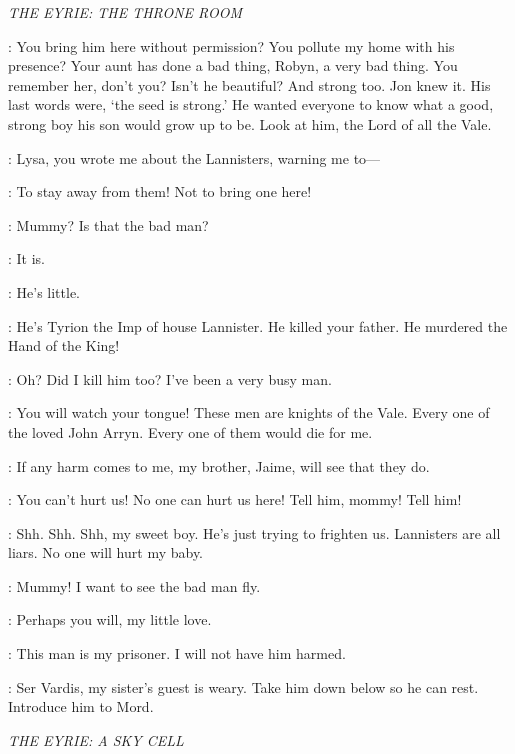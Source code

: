 \scene

\textit{THE EYRIE: THE THRONE ROOM} 


\LYSA: You bring him here without permission? You pollute my home with his presence?  Your aunt has done a bad thing, Robyn, a very bad thing. You remember her, don't you?  Isn't he beautiful? And strong too. Jon knew it. His last words were, `the seed is strong.' He wanted everyone to know what a good, strong boy his son would grow up to be. Look at him, the Lord of all the Vale. 

\CATELYN: Lysa, you wrote me about the Lannisters, warning me to---

\LYSA: To stay away from them! Not to bring one here! 

\ROBYN: Mummy? Is that the bad man? 

\LYSA: It is. 

\ROBYN: He's little. 

\LYSA: He's Tyrion the Imp of house Lannister. He killed your father. He murdered the Hand of the King! 

\TYRION: Oh? Did I kill him too? I've been a very busy man. 

\LYSA: You will watch your tongue! These men are knights of the Vale. Every one of the loved John Arryn. Every one of them would die for me. 

\TYRION: If any harm comes to me, my brother, Jaime, will see that they do. 

\ROBYN: You can't hurt us! No one can hurt us here! Tell him, mommy! Tell him! 

\LYSA: Shh. Shh. Shh, my sweet boy. He's just trying to frighten us. Lannisters are all liars. No one will hurt my baby. 

\ROBYN: Mummy! I want to see the bad man fly. 

\LYSA: Perhaps you will, my little love. 

\CATELYN: This man is my prisoner. I will not have him harmed. 

\LYSA: Ser Vardis, my sister's guest is weary. Take him down below so he can rest. Introduce him to Mord. 

\scene

\textit{THE EYRIE: A SKY CELL}


